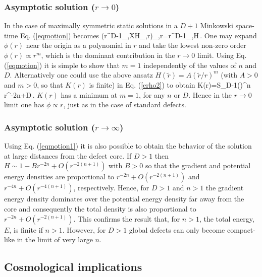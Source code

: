 \documentclass[prd,twocolumn,a4paper,superscriptaddress,floatfix]{revtex4}
\begin{document}
\subsubsection{\rm Asymptotic solution ($r \to 0$)}

In the case of maximally symmetric static solutions in a $D+1$ Minkowski space-time Eq.  (\ref{eqmotion}) becomes
\be
\label{eqmotion1}
(r^{D-1}_{,X}H_{,r})_{,r}=r^{D-1}_{,H}\,.
\ee
One may expand $\phi(r)$ near the origin as a polynomial in $r$ and take the lowest non-zero order $\phi(r) \propto r^m$, which is the dominant contribution in the $r \to 0$ limit. Using Eq.  (\ref{eqmotion}) it is simple to show that $m=1$ independently of the values of $n$ and $D$. Alternatively one could use the above ansatz $H({\tilde r})=A ({\tilde r}/r)^m$ (with $A>0$ and $m>0$, so that $K(r)$ is finite) in Eq.  (\ref{erho2}) to obtain
\be
K(r)=S_{D-1}\left(\right)^n r^{-2n+D}\,.
\ee
$K(r)$ has a minimum at $m=1$, for any $n$ or $D$. Hence in the $r \to 0$ limit one has $\phi \propto r$, just as in the case of standard defects. 

\subsubsection{\rm Asymptotic solution ($r \to \infty$)}

Using Eq. (\ref{eqmotion1}) it is also possible to obtain the behavior of the solution at large distances from the defect core. If $D>1$ then $H \sim 1 - Br^{-2n}+O(r^{-2(n+1)})$ with $B>0$ so that the gradient and potential energy densities are proportional to $r^{-2n}+O(r^{-2(n+1)})$ and $r^{-4n}+O(r^{-4(n+1)})$, respectively. Hence, for $D>1$ and $n>1$ the gradient energy density dominates over the potential energy density far away from the core and consequently the total density  is also proportional to $r^{-2n}+O(r^{-2(n+1)})$. This confirms the result that, for $n >1$, the total energy, $E$, is finite if $n>1$. However, for $D>1$ global defects can only become compact-like in the limit of very large $n$. 

\subsection{Cosmological implications}
\end{document}
